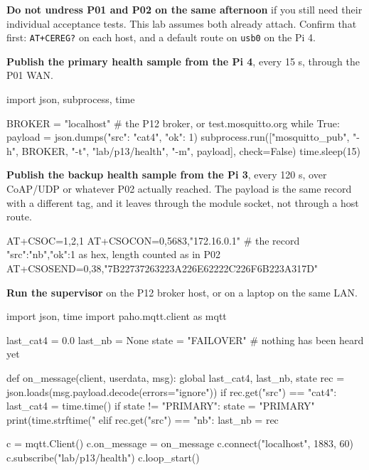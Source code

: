 \begin{steps}
\item \textbf{Do not undress P01 and P02 on the same afternoon} if you still need their individual acceptance tests. This lab assumes both already attach. Confirm that first: \texttt{AT+CEREG?} on each host, and a default route on \texttt{usb0} on the Pi 4.

\item \textbf{Publish the primary health sample from the Pi 4}, every 15 s, through the P01 WAN.
\begin{pycode}
import json, subprocess, time

BROKER = "localhost"        # the P12 broker, or test.mosquitto.org
while True:
    payload = json.dumps({"src": "cat4", "ok": 1})
    subprocess.run(["mosquitto_pub", "-h", BROKER,
                    "-t", "lab/p13/health", "-m", payload], check=False)
    time.sleep(15)
\end{pycode}

\item \textbf{Publish the backup health sample from the Pi 3}, every 120 s, over CoAP/UDP or whatever P02 actually reached. The payload is the same record with a different tag, and it leaves through the module socket, not through a host route.
\begin{atcode}
AT+CSOC=1,2,1
AT+CSOCON=0,5683,"172.16.0.1"
# the record {"src":"nb","ok":1} as hex, length counted as in P02
AT+CSOSEND=0,38,"7B22737263223A226E62222C226F6B223A317D"
\end{atcode}

\item \textbf{Run the supervisor} on the P12 broker host, or on a laptop on the same LAN.
\begin{pycode}
import json, time
import paho.mqtt.client as mqtt

last_cat4 = 0.0
last_nb = None
state = "FAILOVER"          # nothing has been heard yet

def on_message(client, userdata, msg):
    global last_cat4, last_nb, state
    rec = json.loads(msg.payload.decode(errors="ignore"))
    if rec.get("src") == "cat4":
        last_cat4 = time.time()
        if state != "PRIMARY":
            state = "PRIMARY"
            print(time.strftime("%
    elif rec.get("src") == "nb":
        last_nb = rec

c = mqtt.Client()
c.on_message = on_message
c.connect("localhost", 1883, 60)
c.subscribe("lab/p13/health")
c.loop_start()


\end{pycode}
\end{steps}
